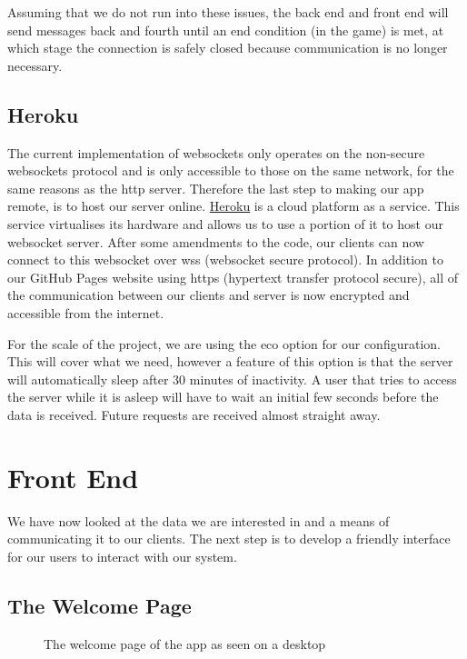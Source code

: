 Assuming that we do not run into these issues, the back end and front end will send messages back and fourth until an end condition (in the game) is met, at which stage the connection is safely closed because communication is no longer necessary.

\subsection{Heroku}

The current implementation of websockets only operates on the non-secure websockets protocol and is only accessible to those on the same network, for the same reasons as the http server. Therefore the last step to making our app remote, is to host our server online. \href{https://www.heroku.com}{Heroku} is a cloud platform as a service. This service virtualises its hardware and allows us to use a portion of it to host our websocket server. After some amendments to the code, our clients can now connect to this websocket over wss (websocket secure protocol). In addition to our GitHub Pages website using https (hypertext transfer protocol secure), all of the communication between our clients and server is now encrypted and accessible from the internet.

For the scale of the project, we are using the eco option for our configuration. This will cover what we need, however a feature of this option is that the server will automatically sleep after 30 minutes of inactivity. A user that tries to access the server while it is asleep will have to wait an initial few seconds before the data is received. Future requests are received almost straight away.

\section{Front End}

We have now looked at the data we are interested in and a means of communicating it to our clients. The next step is to develop a friendly interface for our users to interact with our system.

\subsection{The Welcome Page}

\begin{figure}
    \begin{center}
        \caption{The welcome page of the app as seen on a desktop}
        \label{fig:welcomePage}
    \end{center}
\end{figure}

